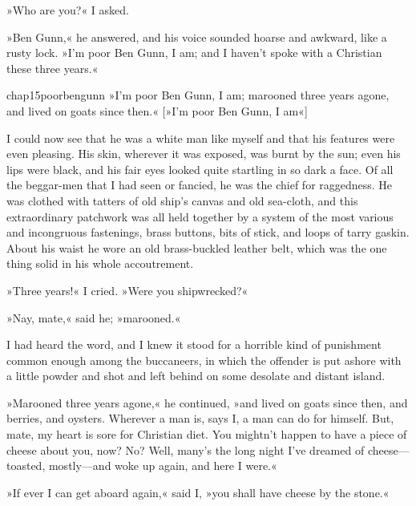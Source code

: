 »Who are you?« I asked.

»Ben Gunn,« he answered, and his voice sounded hoarse and awkward, like a rusty lock. »I'm poor Ben Gunn, I am; and I haven't spoke with a Christian these three years.«


\begin{bwbigpic}
	[\picsize]
	{chap15poorbengunn}
	{»I'm poor Ben Gunn, I am; marooned three years agone, and lived on goats since then.«}
	[»I'm poor Ben Gunn, I am«]
\end{bwbigpic}

I could now see that he was a white man like myself and that his features were even pleasing. His skin, wherever it was exposed, was burnt by the sun; even his lips were black, and his fair eyes looked quite startling in so dark a face. Of all the beggar-men that I had seen or fancied, he was the chief for raggedness. He was clothed with tatters of old ship's canvas and old sea-cloth, and this extraordinary patchwork was all held together by a system of the most various and incongruous fastenings, brass buttons, bits of stick, and loops of tarry gaskin. About his waist he wore an old brass-buckled leather belt, which was the one thing solid in his whole accoutrement.

»Three years!« I cried. »Were you shipwrecked?«

»Nay, mate,« said he; »marooned.«

I had heard the word, and I knew it stood for a horrible kind of punishment common enough among the buccaneers, in which the offender is put ashore with a little powder and shot and left behind on some desolate and distant island.

»Marooned three years agone,« he continued, »and lived on goats since then, and berries, and oysters. Wherever a man is, says I, a man can do for himself. But, mate, my heart is sore for Christian diet. You mightn't happen to have a piece of cheese about you, now? No? Well, many's the long night I've dreamed of cheese—toasted, mostly—and woke up again, and here I were.«

»If ever I can get aboard again,« said I, »you shall have cheese by the stone.«

